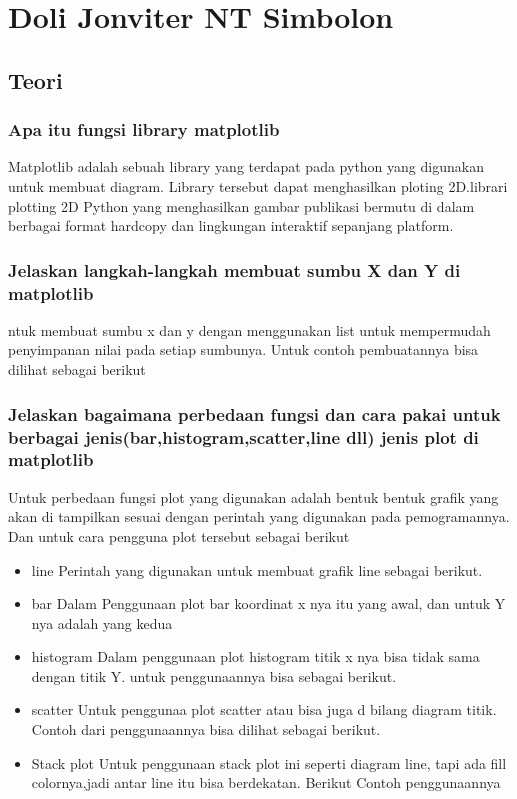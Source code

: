 \section{Doli Jonviter NT Simbolon}
\subsection{Teori}
\subsubsection{Apa itu fungsi library matplotlib}
\hfill \break
Matplotlib adalah sebuah library yang terdapat  pada python yang digunakan untuk membuat diagram. Library tersebut dapat menghasilkan ploting 2D.librari plotting 2D Python yang menghasilkan gambar publikasi bermutu di dalam berbagai format hardcopy dan lingkungan interaktif sepanjang platform.
\subsubsection{Jelaskan langkah-langkah membuat sumbu X dan Y di matplotlib}
\hfill \break
ntuk membuat sumbu x dan y dengan  menggunakan list untuk mempermudah penyimpanan nilai pada setiap sumbunya.
Untuk contoh pembuatannya bisa dilihat sebagai berikut

\subsubsection{Jelaskan bagaimana perbedaan fungsi dan cara pakai untuk berbagai jenis(bar,histogram,scatter,line dll) jenis plot di matplotlib}
\hfill \break
Untuk perbedaan fungsi plot yang digunakan adalah bentuk bentuk grafik yang akan di tampilkan sesuai dengan perintah yang digunakan pada pemogramannya.
Dan untuk cara pengguna plot tersebut sebagai berikut
\begin{itemize}
    \item line
    Perintah yang digunakan untuk membuat grafik line sebagai berikut.
    
    \item bar
    Dalam Penggunaan plot bar koordinat x nya itu yang awal, dan untuk Y nya adalah yang kedua
    
    \item histogram
    Dalam penggunaan plot histogram titik x nya bisa tidak sama dengan titik Y.
    untuk penggunaannya bisa sebagai berikut.
    
    \item scatter
    Untuk penggunaa plot scatter atau bisa juga d bilang diagram titik.
    Contoh dari penggunaannya bisa dilihat sebagai berikut.
    
    \item Stack plot
    Untuk penggunaan stack plot ini seperti diagram line, tapi ada fill colornya,jadi antar line itu bisa berdekatan.
    Berikut Contoh penggunaannya
    
\end{itemize}
